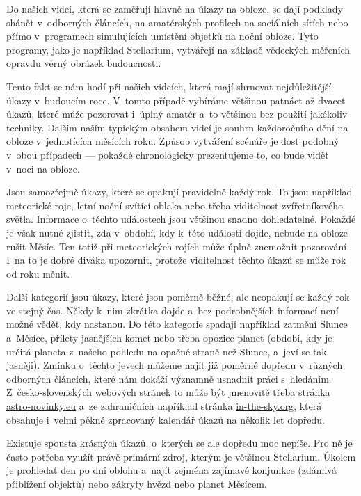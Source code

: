 \documentclass[12pt,a4paper,titlepage]{article}
\begin{document}
Do našich videí, která se zaměřují hlavně na úkazy na obloze, se dají podklady shánět v~odborných článcích, na amatérských profilech na sociálních sítích nebo přímo v~programech simulujících umístění objetků na noční obloze. Tyto programy, jako je například Stellarium, vytvářejí na základě vědeckých měřeních opravdu věrný obrázek budoucnosti. 

Tento fakt se nám hodí při našich videích, která mají shrnovat nejdůležitější úkazy v~budoucím roce. V~tomto případě vybíráme většinou patnáct až dvacet úkazů, které může pozorovat i~úplný amatér a~to většinou bez použití jakékoliv techniky. Dalším naším typickým obsahem videí je souhrn každoročního dění na obloze v~jednotících měsících roku. Způsob vytváření scénáře je dost podobný v~obou případech --- pokaždé chronologicky prezentujeme to, co bude vidět v~noci na obloze.

Jsou samozřejmě úkazy, které se opakují pravidelně každý rok. To jsou například meteorické roje, letní noční svítící oblaka nebo třeba viditelnost zvířetníkového světla. Informace o~těchto událostech jsou většinou snadno dohledatelné. Pokaždé je však nutné zjistit, zda v~období, kdy k~této události dojde, nebude na obloze rušit Měsíc. Ten totiž při meteorických rojích může úplně znemožnit pozorování. I~na to je dobré diváka upozornit, protože viditelnost těchto úkazů se může rok od roku měnit.

Další kategorií jsou úkazy, které jsou poměrně běžné, ale neopakují se každý rok ve stejný čas. Někdy k~nim zkrátka dojde a~bez podrobnějších informací není možné vědět, kdy nastanou. Do této kategorie spadají například zatmění Slunce a~Měsíce, přílety jasnějších komet nebo třeba opozice planet (období, kdy je určitá planeta z~našeho pohledu na opačné straně než Slunce, a~jeví se tak jasněji). Zmínku o~těchto jevech můžeme najít již poměrně dopředu v~různých odborných článcích, které nám dokáží významně usnadnit práci s~hledáním. Z~česko-slovenských webových stránek to může být jmenovitě třeba stránka \href{https://www.astro-novinky.eu}{astro-novinky.eu} a~ze zahraničních například stránka \href{https://in-the-sky.org}{in-the-sky.org}, která obsahuje i~velmi pěkně zpracovaný kalendář úkazů na několik let dopředu.

Existuje spousta krásných úkazů, o~kterých se ale dopředu moc nepíše. Pro ně je často potřeba využít právě primární zdroj, kterým je většinou Stellarium. Úkolem je prohledat den po dni oblohu a~najít zejména zajímavé konjunkce (zdánlivá přiblížení objektů) nebo zákryty hvězd nebo planet Měsícem.\@ 
\end{document}
